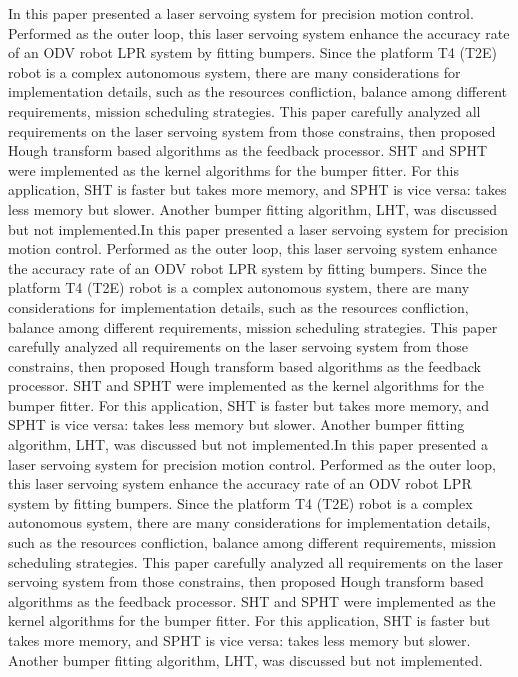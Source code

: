 \documentclass{article}
\begin{document}
In this paper presented a laser servoing system for precision motion control. Performed as the outer loop, this laser servoing system enhance the accuracy rate of an ODV robot LPR system by fitting bumpers. Since the platform T4 (T2E) robot is a complex autonomous system, there are many considerations for implementation details, such as the resources confliction, balance among different requirements, mission scheduling strategies. This paper carefully analyzed all requirements on the laser servoing system from those constrains, then proposed Hough transform based algorithms as the feedback processor. SHT and SPHT were implemented as the kernel algorithms for the bumper fitter. For this application, SHT is faster but takes more memory, and SPHT is vice versa: takes less memory but slower. Another bumper fitting algorithm, LHT, was discussed but not implemented.In this paper presented a laser servoing system for precision motion control. Performed as the outer loop, this laser servoing system enhance the accuracy rate of an ODV robot LPR system by fitting bumpers. Since the platform T4 (T2E) robot is a complex autonomous system, there are many considerations for implementation details, such as the resources confliction, balance among different requirements, mission scheduling strategies. This paper carefully analyzed all requirements on the laser servoing system from those constrains, then proposed Hough transform based algorithms as the feedback processor. SHT and SPHT were implemented as the kernel algorithms for the bumper fitter. For this application, SHT is faster but takes more memory, and SPHT is vice versa: takes less memory but slower. Another bumper fitting algorithm, LHT, was discussed but not implemented.In this paper presented a laser servoing system for precision motion control. Performed as the outer loop, this laser servoing system enhance the accuracy rate of an ODV robot LPR system by fitting bumpers. Since the platform T4 (T2E) robot is a complex autonomous system, there are many considerations for implementation details, such as the resources confliction, balance among different requirements, mission scheduling strategies. This paper carefully analyzed all requirements on the laser servoing system from those constrains, then proposed Hough transform based algorithms as the feedback processor. SHT and SPHT were implemented as the kernel algorithms for the bumper fitter. For this application, SHT is faster but takes more memory, and SPHT is vice versa: takes less memory but slower. Another bumper fitting algorithm, LHT, was discussed but not implemented.
\end{document}
